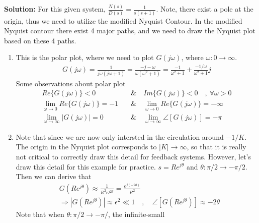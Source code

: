 \documentclass[twoside]{article}
\begin{document}
\vspace{12 pt}

\textbf{Solution:} For this given system, $\frac{N(s)}{D(s)} =
\frac{1}{s (s+1) }$. Note, there exist a pole at the origin, thus 
we need to utilize the modified Nyquist Contour. 
In the modified Nyquist contour there exist 4 major paths, 
and we need to draw the Nyquist plot based on these 4 paths. 

\begin{enumerate}
  \item This is the polar plot, where we need to plot $G(j \omega)$, where $\omega : 0 \to
    \infty$. 
    \begin{align*}
      G(j \omega) = \frac{1}{j \omega (j \omega +1)} = \frac{ -j  - \omega }{\omega
      (\omega^2 + 1) } = \frac{-1}{\omega^2 + 1} + \frac{-1/\omega}{
      \omega^2 + 1} j
    \end{align*}
%
   Some observations about polar plot
    \begin{align*}
       Re \lbrace G(j \omega) \rbrace < 0 \quad & \&  \quad  Im \lbrace G(j
                                                \omega) \rbrace < 0 \quad , \ \forall  \omega > 0 
      \\
        \lim_{\omega \to 0} Re \lbrace G(j \omega) \rbrace = - 1
       \quad & \& \quad
       \lim_{\omega \to 0} Re \lbrace G(j \omega) \rbrace = - \infty
        \\
       \lim_{\omega \to \infty} | G(j \omega) | = 0
        \quad & \& \quad
      \lim_{\omega \to \infty} \angle [ G(j \omega) ] = -\pi
      \end{align*}
  \item Note that since we are now only intersted in the circulation around
    $-1/K$. The origin in the Nyquist plot corresponds to $| K | \to
    \infty$, so that it is really not critical to correctly draw this
    detail for feedback systems. 
     However, let's draw this detail for this example for practice. 
     $s = R e^{j \theta}$ and $\theta : \pi/2 \to -\pi/2$.  Then 
   we can derive that  
   \begin{align*}
     & G \left( R e^{j \theta} \right) \approx \frac{1}{R^2 e^{j
       2 \theta}} = \frac{e^{j (-2 \theta)}}{R^2}
       \\
    &\Rightarrow | G \left( R e^{j \theta} \right) | \approx
      \epsilon^2 \ll 1
   \quad , \quad \angle [ G \left( R e^{j \theta} \right) ] \approx -2
      \theta
   \end{align*}
   Note that when $\theta : \pi/2 \to -\pi/$, the infinite-small 

\end{enumerate}
\end{document}
